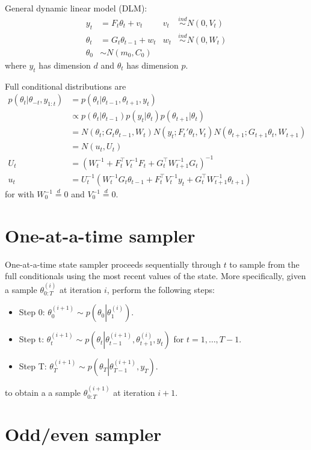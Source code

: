 \documentclass{article}
\begin{document}
General dynamic linear model (DLM):
\begin{align*}
y_t &= F_t\theta_t +v_t &v_t&\stackrel{ind}{\sim} N(0,V_t) \\
\theta_t &= G_t\theta_{t-1} + w_t & w_t&\stackrel{ind}{\sim} N(0,W_t) \\
\theta_0 & \sim N(m_0,C_0) 
\end{align*}
where $y_t$ has dimension $d$ and $\theta_t$ has dimension $p$. 

Full conditional distributions are
\begin{align*}
p(\theta_t|\theta_{-t},y_{1:t}) &= p(\theta_t|\theta_{t-1},\theta_{t+1},y_t) \\
&\propto p(\theta_t|\theta_{t-1})p(y_t|\theta_t)p(\theta_{t+1}|\theta_t) \\
&= N(\theta_t;G_t\theta_{t-1},W_t) N(y_t;F_t'\theta_t,V_t) N(\theta_{t+1};G_{t+1}\theta_t,W_{t+1}) \\
&= N(u_t,U_t) \\
U_t &= \left(W_t^{-1}+F_t^\top V_t^{-1}F_t + G_t^\top W_{t+1}^{-1}G_t \right)^{-1} \\
u_t &= U_t^{-1} \left( W_t^{-1}G_t\theta_{t-1} + F_t^\top V_t^{-1} y_t + G_t^\top W_{t+1}^{-1} \theta_{t+1}  \right)
\end{align*}
for with $W_0^{-1}\stackrel{d}{=}0$ and $V_0^{-1}\stackrel{d}{=}0$. 

\section*{One-at-a-time sampler}

One-at-a-time state sampler proceeds sequentially through $t$ to sample from the full conditionals using the most recent values of the state. More specifically, given a sample $\theta_{0:T}^{(i)}$ at iteration $i$, perform the following steps:
\begin{itemize}
\item Step 0: $\theta_0^{(i+1)} \sim p\left(\theta_0\left|\theta_1^{(i)}\right.\right)$.
\item Step t: $\theta_t^{(i+1)} \sim p\left(\theta_t\left|\theta_{t-1}^{(i+1)},\theta_{t+1}^{(i)},y_t\right.\right)$ for $t=1,\ldots,T-1$.
\item Step T: $\theta_T^{(i+1)} \sim p\left(\theta_T\left|\theta_{T-1}^{(i+1)},y_T\right.\right)$.
\end{itemize}
to obtain a a sample $\theta_{0:T}^{(i+1)}$ at iteration $i+1$.

\section*{Odd/even sampler}
\end{document}
